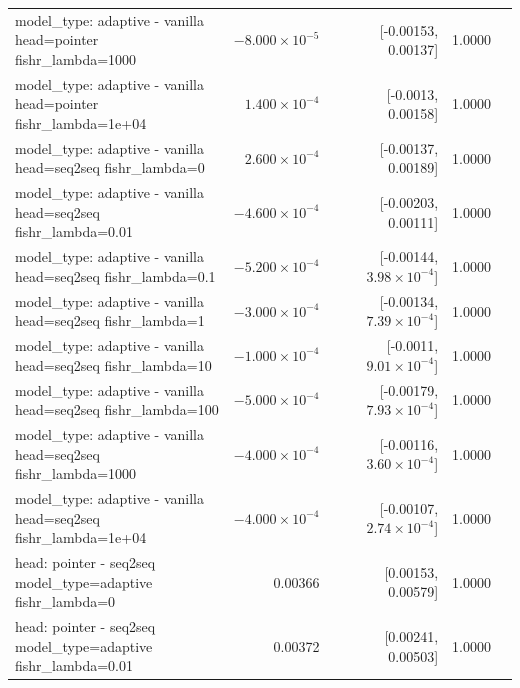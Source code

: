 \documentclass[10pt]{article}
\makeatletter
\newcommand{\stackcell}[1]{\begin{tabular}[t]{@{}l@{}}#1\end{tabular}}
\makeatother
\begin{document}
{\begin{longtable}{lrrrl}
\stackcell{model\_type: adaptive - vanilla\\\footnotesize head=pointer fishr\_lambda=1000 } & $-8.000\times10^{-5}$ & [-0.00153, 0.00137] & 1.0000 & \\
\stackcell{model\_type: adaptive - vanilla\\\footnotesize head=pointer fishr\_lambda=1e+04 } & $1.400\times10^{-4}$ & [-0.0013, 0.00158] & 1.0000 & \\
\stackcell{model\_type: adaptive - vanilla\\\footnotesize head=seq2seq fishr\_lambda=0 } & $2.600\times10^{-4}$ & [-0.00137, 0.00189] & 1.0000 & \\
\stackcell{model\_type: adaptive - vanilla\\\footnotesize head=seq2seq fishr\_lambda=0.01 } & $-4.600\times10^{-4}$ & [-0.00203, 0.00111] & 1.0000 & \\
\stackcell{model\_type: adaptive - vanilla\\\footnotesize head=seq2seq fishr\_lambda=0.1 } & $-5.200\times10^{-4}$ & [-0.00144, $3.98\times10^{-4}$] & 1.0000 & \\
\stackcell{model\_type: adaptive - vanilla\\\footnotesize head=seq2seq fishr\_lambda=1 } & $-3.000\times10^{-4}$ & [-0.00134, $7.39\times10^{-4}$] & 1.0000 & \\
\stackcell{model\_type: adaptive - vanilla\\\footnotesize head=seq2seq fishr\_lambda=10 } & $-1.000\times10^{-4}$ & [-0.0011, $9.01\times10^{-4}$] & 1.0000 & \\
\stackcell{model\_type: adaptive - vanilla\\\footnotesize head=seq2seq fishr\_lambda=100 } & $-5.000\times10^{-4}$ & [-0.00179, $7.93\times10^{-4}$] & 1.0000 & \\
\stackcell{model\_type: adaptive - vanilla\\\footnotesize head=seq2seq fishr\_lambda=1000 } & $-4.000\times10^{-4}$ & [-0.00116, $3.60\times10^{-4}$] & 1.0000 & \\
\stackcell{model\_type: adaptive - vanilla\\\footnotesize head=seq2seq fishr\_lambda=1e+04 } & $-4.000\times10^{-4}$ & [-0.00107, $2.74\times10^{-4}$] & 1.0000 & \\
\stackcell{head: pointer - seq2seq\\\footnotesize model\_type=adaptive fishr\_lambda=0 } & 0.00366 & [0.00153, 0.00579] & 1.0000 & \\
\stackcell{head: pointer - seq2seq\\\footnotesize model\_type=adaptive fishr\_lambda=0.01 } & 0.00372 & [0.00241, 0.00503] & 1.0000 & \\

\end{longtable}}
\end{document}
